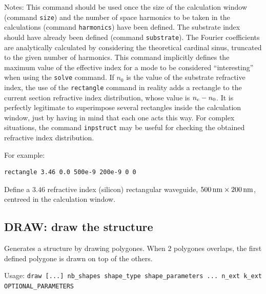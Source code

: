 Notes:
    This command should be used once the size of the calculation window (command \lstinline!size!)  and    the number of space harmonics to be taken in the calculations (command \lstinline!harmonics!)  have been defined.
    The substrate index should have already been defined (command \lstinline!substrate!). The Fourier coefficients are analytically calculated by considering the theoretical cardinal sinus, truncated to the given number of harmonics.
    This command implicitly defines the maximum value of the effective index for a mode to be considered ``interesting'' when using the \lstinline!solve! command.
    If $n_0$ is the value of the substrate refractive index, the use of the \lstinline!rectangle! command in reality adds a rectangle to the current section refractive index distribution, whose value is $n_\mathrm{c}-n_0$. It is  perfectly legitimate to superimpose several rectangles inside the calculation window, just by having in mind that each one acts this way. For complex situations, the command \lstinline!inpstruct! may be useful for checking the obtained refractive index distribution.

For example:
\begin{lstlisting}
rectangle 3.46 0.0 500e-9 200e-9 0 0
\end{lstlisting}
Define a $3.46$ refractive index (silicon) rectangular waveguide, $500\,\mathrm{nm} \times 200\,\mathrm{nm}$, centreed in the calculation window.

\subsection{DRAW: draw the structure}
\label{subsec_draw}

Generates a structure by drawing polygones. When 2 polygones overlaps, the first defined polygone is drawn on top of the others.

Usage: \lstinline!draw [...] nb_shapes shape_type shape_parameters ... n_ext k_ext OPTIONAL_PARAMETERS!


